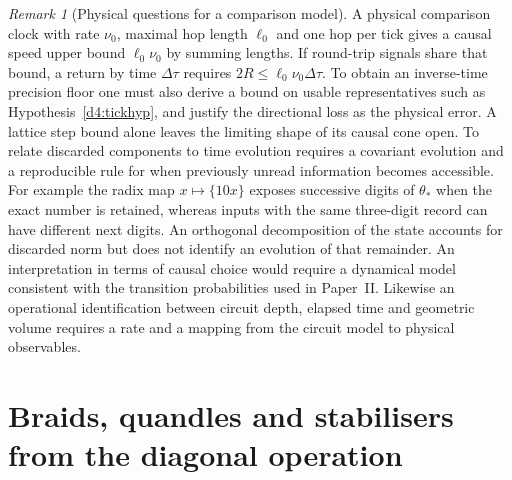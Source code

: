 \documentclass[11pt,reqno]{amsart}
\theoremstyle{definition}
\theoremstyle{remark}
\newtheorem{remark}[theorem]{Remark}
\numberwithin{equation}{section}
\begin{document}
\begin{remark}[Physical questions for a comparison model]\label{d4:programme}
A physical comparison clock with rate \(\nu_0\), maximal hop length
\(\ell_0\) and one hop per tick gives a causal speed upper bound
\(\ell_0\nu_0\) by summing lengths. If round-trip signals share that
bound, a return by time \(\Delta\tau\) requires
\(2R\le\ell_0\nu_0\Delta\tau\). To obtain an inverse-time precision
floor one must also derive a bound on usable representatives such
as Hypothesis~\ref{d4:tickhyp}, and justify the directional loss as
the physical error. A lattice step bound alone leaves the limiting
shape of its causal cone open. To relate discarded components to
time evolution requires a covariant evolution and a reproducible
rule for when previously unread information becomes accessible.
For example the radix map \(x\mapsto\{10x\}\) exposes successive
digits of \(\theta_*\) when the exact number is retained, whereas
inputs with the same three-digit record can have different next
digits. An orthogonal decomposition of the state accounts for
discarded norm but does not identify an evolution of that remainder.
An interpretation in terms of causal choice would require a
dynamical model consistent with the transition probabilities used
in Paper~II. Likewise an operational identification between circuit
depth, elapsed time and geometric volume requires a rate and a
mapping from the circuit model to physical observables.
\end{remark}

\section{Braids, quandles and stabilisers from the diagonal operation}\label{sec:m7}
\end{document}
